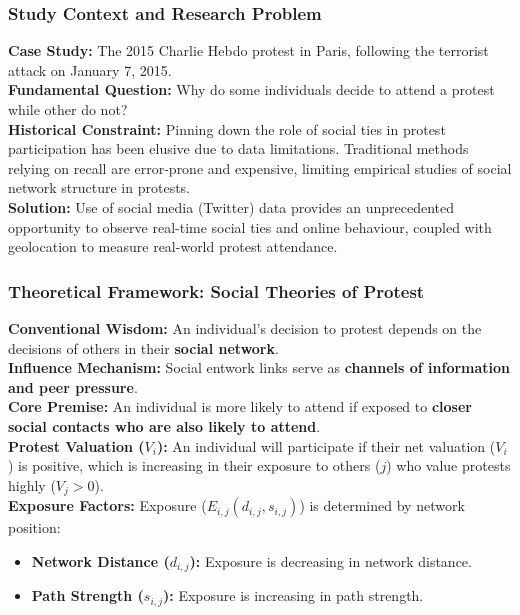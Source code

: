 \documentclass{article}
\begin{document}
    \subsubsection{Study Context and Research Problem}

    \noindent \textbf{Case Study:} The 2015 Charlie Hebdo protest in Paris,
following the terrorist attack on January 7, 2015.\\

    \noindent \textbf{Fundamental Question:} Why do some individuals decide
to attend a protest while other do not?\\

    \noindent \textbf{Historical Constraint:} Pinning down the role of
social ties in protest participation has been elusive due to data
limitations. Traditional methods relying on recall are error-prone and
expensive, limiting empirical studies of social network structure in protests.\\

    \noindent \textbf{Solution:} Use of social media (Twitter) data provides
an unprecedented opportunity to observe real-time social ties and online
behaviour, coupled with geolocation to measure real-world protest attendance.

    \subsubsection{Theoretical Framework: Social Theories of Protest}

    \noindent \textbf{Conventional Wisdom:} An individual's decision to
protest depends on the decisions of others in their \textbf{social network}.\\

    \noindent \textbf{Influence Mechanism:} Social entwork links serve as \textbf{channels of information and peer pressure}.\\

    \noindent \textbf{Core Premise:} An individual is more likely to attend
if exposed to \textbf{closer social contacts who are also likely to attend}.\\

    \noindent \textbf{Protest Valuation ($V_i$):} An individual will
participate if their net valuation ($V_i$) is positive, which is increasing
in their exposure to others ($j$) who value protests highly ($V_j > 0$).\\

    \noindent \textbf{Exposure Factors:} Exposure ($E_{i,j} (d_{i,j}, s_{i,j})$) is
determined
by network position:
    \begin{itemize}
        \item \textbf{Network Distance ($d_{i,j}$):} Exposure is decreasing
        in network distance.
        \item \textbf{Path Strength ($s_{i,j}$):} Exposure is increasing in
        path strength.
    \end{itemize}
\end{document}
